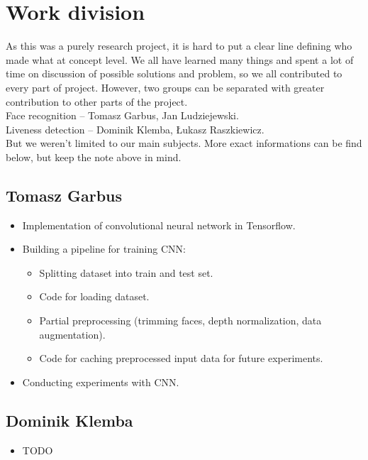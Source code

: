 \chapter{Work division}
    As this was a purely research project, it is hard to
    put a clear line defining who made what at concept level.
    We all have learned many things and spent a lot of time
    on discussion of possible solutions and problem,
    so we all contributed to every part of project.
    However, two groups can be separated
    with greater contribution to other parts of the project.\\
    Face recognition -- Tomasz Garbus, Jan Ludziejewski.\\
    Liveness detection -- Dominik Klemba, Łukasz Raszkiewicz.\\
    But we weren't limited to our main subjects.
    More exact informations can be find below, but keep the note above in mind.

    \section{Tomasz Garbus}
        \begin{itemize}
            \item Implementation of convolutional neural network in Tensorflow.
            \item Building a pipeline for training CNN:
            \begin{itemize}
                \item Splitting dataset into train and test set.
                \item Code for loading dataset.
                \item Partial preprocessing (trimming faces, depth normalization,
                      data augmentation).
                \item Code for caching preprocessed input data for future experiments.
            \end{itemize}
            \item Conducting experiments with CNN.
        \end{itemize}

    \section{Dominik Klemba}
        \begin{itemize}
            \item TODO
        \end{itemize}


